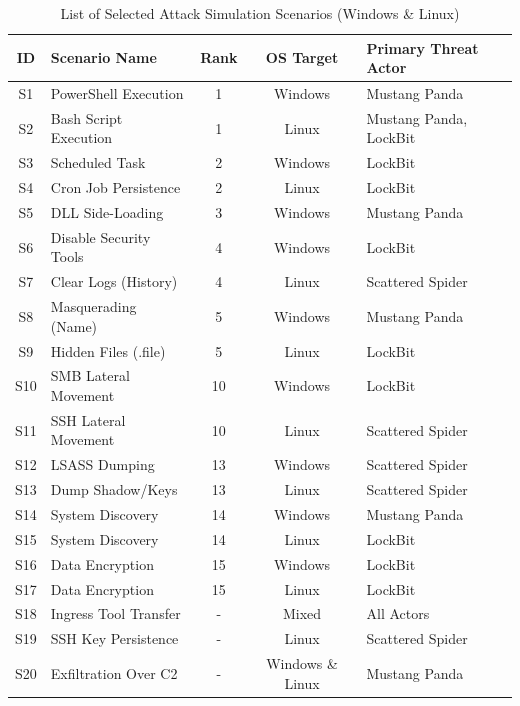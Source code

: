 \begin{table}
    \centering
    \caption{List of Selected Attack Simulation Scenarios (Windows \& Linux)}
    \label{tab:attack_scenarios}
    \renewcommand{\arraystretch}{1.2}
    \begin{tabular}{|c|p{3.8cm}|c|c|p{3.5cm}|}
    \hline
    \textbf{ID} & \textbf{Scenario Name} & \textbf{Rank} & \textbf{OS Target} & \textbf{Primary Threat Actor} \\ \hline
    S1 & PowerShell Execution & 1 & Windows & Mustang Panda \\ \hline
    S2 & Bash Script Execution & 1 & Linux & Mustang Panda, LockBit \\ \hline
    S3 & Scheduled Task & 2 & Windows & LockBit \\ \hline
    S4 & Cron Job Persistence & 2 & Linux & LockBit \\ \hline
    S5 & DLL Side-Loading & 3 & Windows & Mustang Panda \\ \hline
    S6 & Disable Security Tools & 4 & Windows & LockBit \\ \hline
    S7 & Clear Logs (History) & 4 & Linux & Scattered Spider \\ \hline
    S8 & Masquerading (Name) & 5 & Windows & Mustang Panda \\ \hline
    S9 & Hidden Files (.file) & 5 & Linux & LockBit \\ \hline
    S10 & SMB Lateral Movement & 10 & Windows & LockBit \\ \hline
    S11 & SSH Lateral Movement & 10 & Linux & Scattered Spider \\ \hline
    S12 & LSASS Dumping & 13 & Windows & Scattered Spider \\ \hline
    S13 & Dump Shadow/Keys & 13 & Linux & Scattered Spider \\ \hline
    S14 & System Discovery & 14 & Windows & Mustang Panda \\ \hline
    S15 & System Discovery & 14 & Linux & LockBit \\ \hline
    S16 & Data Encryption & 15 & Windows & LockBit \\ \hline
    S17 & Data Encryption & 15 & Linux & LockBit \\ \hline
    S18 & Ingress Tool Transfer & - & Mixed & All Actors \\ \hline
    S19 & SSH Key Persistence & - & Linux & Scattered Spider \\ \hline
    S20 & Exfiltration Over C2 & - & Windows \& Linux & Mustang Panda \\ \hline
    \end{tabular}
\end{table}


